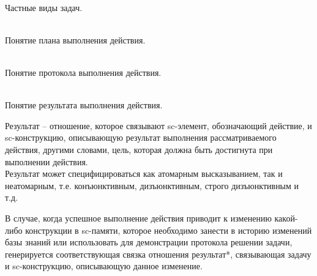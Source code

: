 \begin{frame}{\\Частные виды задач.}
    \topline
	\justifying
    \begin{SCn}
    \end{SCn}
\end{frame}

\begin{frame}{\\Понятие плана выполнения действия.}
	\topline
	\justifying
\end{frame}

\begin{frame}{\\Понятие протокола выполнения действия.}
	\topline
	\justifying
 
\end{frame}

\begin{frame}{\\Понятие результата выполнения действия.}
	\topline
	\justifying
 
    \vspace{0.33cm}
    
    Результат -- отношение, которое  связывают sc-элемент, обозначающий действие, и sc-конструкцию, описывающую результат выполнения рассматриваемого действия, другими словами, цель, которая должна быть достигнута при выполнении действия.\\
    Результат может специфицироваться как атомарным высказыванием, так и неатомарным, т.е. конъюнктивным, дизъюнктивным, строго дизъюнктивным и т.д.\\
    
    \vspace{0.33cm}
    
    В случае, когда успешное выполнение действия приводит к изменению какой-либо конструкции в sc-памяти,  которое необходимо занести в историю изменений базы знаний или использовать для демонстрации протокола решении задачи, генерируется соответствующая связка отношения результат*, связывающая  задачу и sc-конструкцию, описывающую данное изменение. 
\end{frame}

